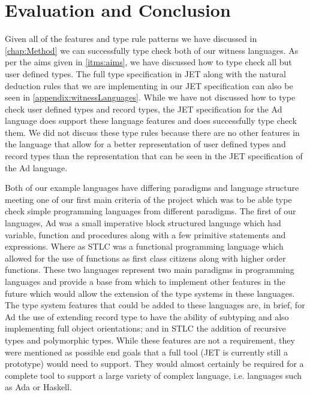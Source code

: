\chapter{Evaluation and Conclusion}
\label{chap:eval}
Given all of the features and type rule patterns we have discussed in \autoref{chap:Method} we can successfully type check both of our witness languages.
As per the aims given in \autoref{itms:aims}, we have discussed how to type check all but user defined types.
The full type specification in JET along with the natural deduction rules that we are implementing in our JET specification can also be seen in \autoref{appendix:witnessLanguages}.
While we have not discussed how to type check user defined types and record types, the JET specification for the Ad language does support these language features and does successfully type check them.
We did not discuss these type rules because there are no other features in the language that allow for a better representation of user defined types and record types than the representation that can be seen in the JET specification of the Ad language.

Both of our example languages have differing paradigms and language structure meeting one of our first main criteria of the project which was to be able type check simple programming languages from different paradigms.
The first of our languages, Ad was a small imperative block structured language which had variable, function and procedures along with a few primitive statements and expressions.
Where as STLC was a functional programming language which allowed for the use of functions as first class citizens along with higher order functions.
These two languages represent two main paradigms in programming languages and provide a base from which to implement other features in the future which would allow the extension of the type systems in these languages.
The type system features that could be added to these languages are, in brief, for Ad the use of extending record type to have the ability of subtyping and also implementing full object orientations; and in STLC the addition of recursive types\cite{pierce2002types,cardelli1996type} and polymorphic types\cite{Cardelli:1985:UTD:6041.6042}.
While these features are not a requirement, they were mentioned as possible end goals that a full tool (JET is currently still a prototype) would need to support.
They would almost certainly be required for a complete tool to support a large variety of complex language, i.e. languages such as Ada or Haskell.

